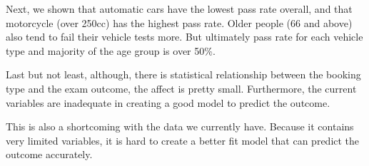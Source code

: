 \documentclass[11pt,a4paper,]{article}
\begin{document}
Next, we shown that automatic cars have the lowest pass rate overall, and that motorcycle (over 250cc) has the highest pass rate. Older people (66 and above) also tend to fail their vehicle tests more. But ultimately pass rate for each vehicle type and majority of the age group is over 50\%.

Last but not least, although, there is statistical relationship between the booking type and the exam outcome, the affect is pretty small. Furthermore, the current variables are inadequate in creating a good model to predict the outcome.

This is also a shortcoming with the data we currently have. Because it contains very limited variables, it is hard to create a better fit model that can predict the outcome accurately.

\printbibliography
\end{document}
